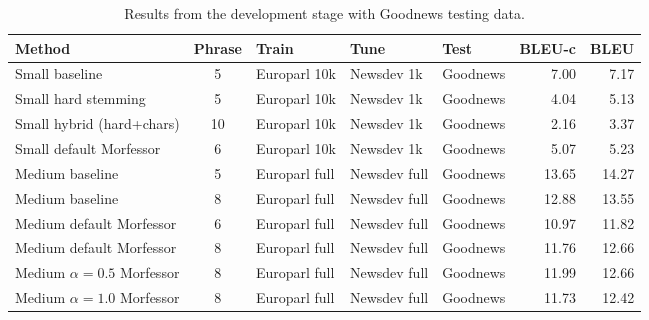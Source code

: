 \begin{table*}
    {\small
    \begin{center}
        \begin{tabular}{lclllrr}
            \hline
            \textbf{Method} & \textbf{Phrase} & \textbf{Train} & \textbf{Tune} &
            \textbf{Test} & \textbf{BLEU-c} & \textbf{BLEU} \\
            \hline
            Small baseline & 5 & Europarl 10k & Newsdev 1k & Goodnews &
            7.00 & 7.17 \\
            \hline
            Small hard stemming & 5 & Europarl 10k & Newsdev 1k & Goodnews
            & 4.04 & 5.13 \\
            Small hybrid (hard+chars) & 10 & Europarl 10k & Newsdev 1k & Goodnews & 2.16
            & 3.37 \\
            Small default Morfessor & 6 & Europarl 10k & Newsdev 1k & Goodnews
            & 5.07 & 5.23 \\
            \hline
            Medium baseline & 5 & Europarl full & Newsdev full & Goodnews &
            13.65 & 14.27 \\
            Medium baseline & 8 & Europarl full & Newsdev full & Goodnews &
            12.88 & 13.55 \\
            \hline
            Medium default Morfessor & 6 & Europarl full & Newsdev full &
            Goodnews & 10.97 & 11.82 \\
            Medium default Morfessor & 8 & Europarl full & Newsdev full &
            Goodnews & 11.76 & 12.66 \\
            Medium $\alpha=0.5$ Morfessor & 8 & Europarl full & Newsdev full &
            Goodnews & 11.99 & 12.66 \\
            Medium $\alpha=1.0$ Morfessor & 8 & Europarl full & Newsdev full &
            Goodnews & 11.73 & 12.42\\
            \hline
        \end{tabular}
    \caption{Results from the development stage with Goodnews testing data.}
    \label{table:dev}
    \end{center}
    }
\end{table*}
